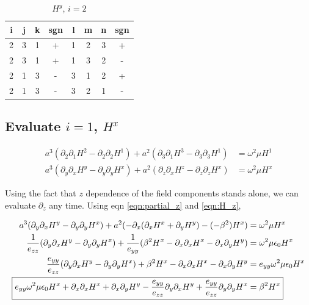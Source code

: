 \documentclass[letter]{article}
\begin{document}
	\begin{table}[h]
	\centering
	\begin{tabular}{|c|c|c|c|c|c|c|c|}
	\hline
	\textbf{i} & \textbf{j} & \textbf{k} & \textbf{sgn} & \textbf{l} & \textbf{m} & \textbf{n} & \textbf{sgn} \\ \hline
	2          & 3          & 1          & +            & 1          & 2          & 3          & +            \\ \hline
	2          & 3          & 1          & +            & 1          & 3          & 2          & -            \\ \hline
	2          & 1          & 3          & -            & 3          & 1          & 2          & +            \\ \hline
	2          & 1          & 3          & -            & 3          & 2          & 1          & -            \\ \hline
	\end{tabular}
	\caption{$H^y$, $i=2$}
	\label{table:Hy}
	\end{table}
	
	\subsection*{Evaluate $i=1$, $H^x$}
	
	\begin{align}
		a^3 (\partial_2 \partial_1 H^2 - \partial_2 \partial_2 H^1) + a^2 (\partial_3 \partial_1 H^3 - \partial_3 \partial_3 							H^1) &= \omega^2 \mu H^1 \\
		a^3 (\partial_y \partial_x H^y - \partial_y \partial_y H^x) + a^2 (\partial_z \partial_x H^z - \partial_z \partial_z 							H^x) &= \omega^2 \mu H^x  
	\end{align}
	
	Using the fact that $z$ dependence of the field components stands alone, we can evaluate $\partial_z$ any time. Using eqn \ref{eqn:partial_z} and \ref{eqn:H_z}, 
	
	\begin{align}
		a^3 (\partial_y \partial_x H^y - \partial_y \partial_y H^x) + a^2 (- \partial_x (\partial_x H^x + \partial_y H^y) - (- \beta^2) H^x) &= \omega^2 \mu H^x\\
		\frac{1}{e_{zz}} (\partial_y \partial_x H^y - \partial_y \partial_y H^x) + \frac{1}{e_{yy}} ( \beta^2 H^x- \partial_x\partial_x H^x - \partial_x \partial_y H^y) &= \omega^2 \mu \epsilon_0 H^x\\
		\frac{e_{yy}}{e_{zz}} (\partial_y \partial_x H^y - \partial_y \partial_y H^x) + \beta^2 H^x- \partial_x\partial_x H^x - \partial_x \partial_y H^y &= e_{yy} \omega^2 \mu \epsilon_0 H^x\\
		\Aboxed{e_{yy} \omega^2 \mu \epsilon_0 H^x + \partial_x\partial_x H^x + \partial_x \partial_y H^y - \frac{e_{yy}}{e_{zz}} \partial_y \partial_x H^y + \frac{e_{yy}}{e_{zz}} \partial_y \partial_y H^x &= \beta^2 H^x}
		\label{eqn:4a}
	\end{align}
	
\end{document}
